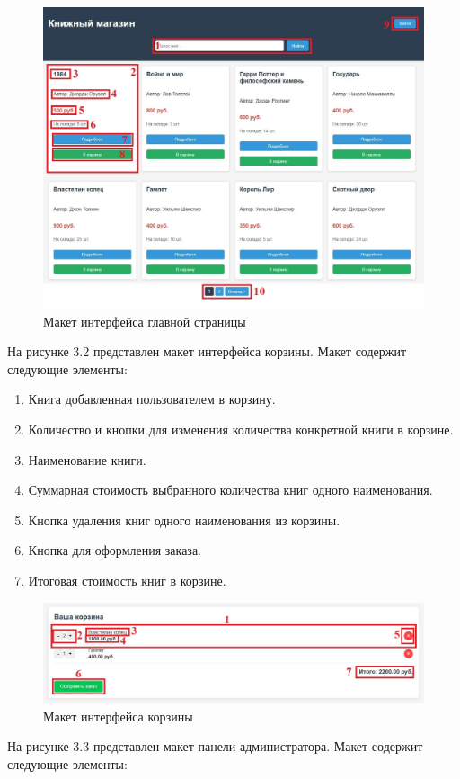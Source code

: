 \begin{figure}[H]
	\centering
	\includegraphics[width=0.7\linewidth]{images/Главная_страница}
	\caption{Макет интерфейса главной страницы}
	\label{fig:}
\end{figure}

На рисунке 3.2 представлен макет интерфейса корзины. Макет содержит следующие элементы:

\begin{enumerate}
	\item Книга добавленная пользователем в корзину.
	\item Количество и кнопки для изменения количества конкретной книги в корзине.
	\item Наименование книги.
	\item Суммарная стоимость выбранного количества книг одного наименования.
	\item Кнопка удаления книг одного наименования из корзины.
	\item Кнопка для оформления заказа.
	\item Итоговая стоимость книг в корзине.
\end{enumerate}

\begin{figure}[H]
	\centering
	\includegraphics[width=0.7\linewidth]{images/Корзина}
	\caption{Макет интерфейса корзины}
	\label{fig:}
\end{figure}

На рисунке 3.3 представлен макет панели администратора. Макет содержит следующие элементы:

